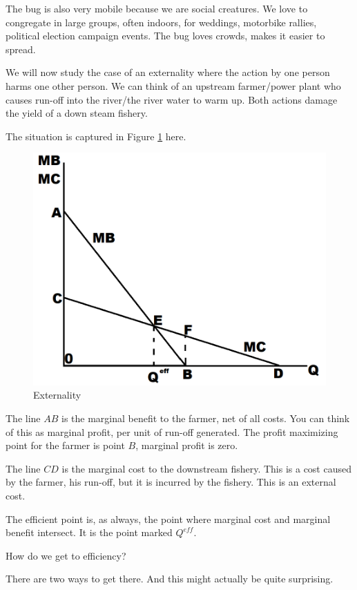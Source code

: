 \documentclass[
]{book}
\begin{document}
The bug is also very mobile because we are social creatures. We love to congregate in large groups, often indoors, for weddings, motorbike rallies, political election campaign events. The bug loves crowds, makes it easier to spread.

We will now study the case of an externality where the action by one person harms one other person. We can think of an upstream farmer/power plant who causes run-off into the river/the river water to warm up. Both actions damage the yield of a down steam fishery.

The situation is captured in Figure \ref{fig:extfig4} here.

\begin{figure}

{\centering \includegraphics[width=0.75\linewidth]{img/externalities/extfig4} 

}

\caption{Externality}\label{fig:extfig4}
\end{figure}

The line \(AB\) is the marginal benefit to the farmer, net of all costs. You can think of this as marginal profit, per unit of run-off generated. The profit maximizing point for the farmer is point \(B\), marginal profit is zero.

The line \(CD\) is the marginal cost to the downstream fishery. This is a cost caused by the farmer, his run-off, but it is incurred by the fishery. This is an external cost.

The efficient point is, as always, the point where marginal cost and marginal benefit intersect. It is the point marked \(Q^{eff}\).

How do we get to efficiency?

There are two ways to get there. And this might actually be quite surprising.
\end{document}
